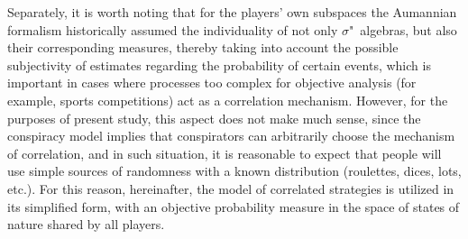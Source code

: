 Separately, it is worth noting that for the players' own subspaces the Aumannian formalism historically assumed the individuality of not only $\sigma$"~algebras, but also their corresponding measures, thereby taking into account the possible subjectivity of estimates regarding the probability of certain events, which is important in cases where processes too complex for objective analysis (for example, sports competitions) act as a correlation mechanism. However, for the purposes of present study, this aspect does not make much sense, since the conspiracy model implies that conspirators can arbitrarily choose the mechanism of correlation, and in such situation, it is reasonable to expect that people will use simple sources of randomness with a known distribution (roulettes, dices, lots, etc.). For this reason, hereinafter, the model of correlated strategies is utilized in its simplified form, with an objective probability measure in the space of states of nature shared by all players. %

